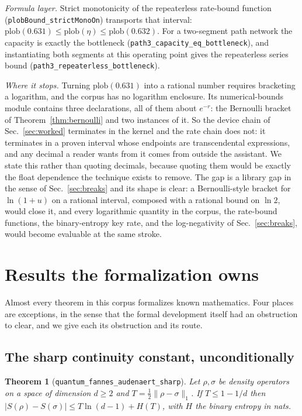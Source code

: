 \documentclass[aps,pra,reprint,nofootinbib,superscriptaddress]{revtex4-2}
\theoremstyle{plain}
\newtheorem{theorem}{Theorem}
\theoremstyle{definition}
\theoremstyle{remark}
\newcommand{\lean}[1]{\texttt{#1}}
\newcommand{\trnorm}[1]{\lVert #1 \rVert_{1}}
\begin{document}
\emph{Formula layer.} Strict monotonicity of the repeaterless rate-bound
function (\lean{plobBound\_strictMonoOn}) transports that interval:
$\mathrm{plob}(0.631) \le \mathrm{plob}(\eta) \le \mathrm{plob}(0.632)$.
For a two-segment path network the capacity is exactly the bottleneck
(\lean{path3\_capacity\_eq\_bottleneck}), and instantiating both segments
at this operating point gives the repeaterless series bound
(\lean{path3\_repeaterless\_bottleneck}).

\emph{Where it stops.} Turning $\mathrm{plob}(0.631)$ into a rational
number requires bracketing a logarithm, and the corpus has no logarithm
enclosure. Its numerical-bounds module contains three declarations, all
of them about $e^{-r}$: the Bernoulli bracket of
Theorem~\ref{thm:bernoulli} and two instances of it. So the device chain
of Sec.~\ref{sec:worked} terminates in the kernel and the rate chain does
not: it terminates in a proven interval whose endpoints are transcendental
expressions, and any decimal a reader wants from it comes from outside
the assistant. We state this rather than quoting decimals, because
quoting them would be exactly the float dependence the technique exists
to remove. The gap is a library gap in the sense of
Sec.~\ref{sec:breaks} and its shape is clear: a Bernoulli-style bracket
for $\ln(1+u)$ on a rational interval, composed with a rational bound on
$\ln 2$, would close it, and every logarithmic quantity in the corpus,
the rate-bound functions, the binary-entropy key rate, and the
log-negativity of Sec.~\ref{sec:breaks}, would become evaluable at the
same stroke.

\section{Results the formalization owns}
\label{sec:owned}

Almost every theorem in this corpus formalizes known mathematics. Four
places are exceptions, in the sense that the formal development itself
had an obstruction to clear, and we give each its obstruction and its
route.

\subsection{The sharp continuity constant, unconditionally}

\begin{theorem}[\lean{quantum\_fannes\_audenaert\_sharp}]
\label{thm:audenaert}
Let $\rho,\sigma$ be density operators on a space of dimension $d\ge2$
and $T = \tfrac12\trnorm{\rho-\sigma}$. If $T \le 1 - 1/d$ then
$|S(\rho)-S(\sigma)| \le T\ln(d-1) + H(T)$, with $H$ the binary entropy
in nats.
\end{theorem}
\end{document}
